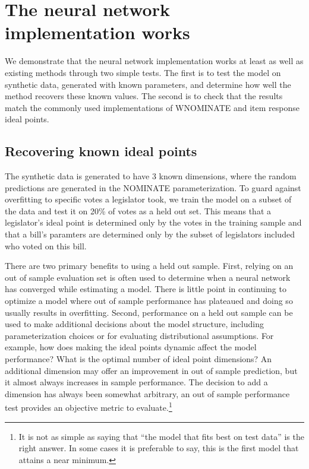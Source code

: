 \documentclass[11pt,]{article}
\begin{document}
\section{The neural network implementation
works}\label{the-neural-network-implementation-works}

We demonstrate that the neural network implementation works at least as
well as existing methods through two simple tests. The first is to test
the model on synthetic data, generated with known parameters, and
determine how well the method recovers these known values. The second is
to check that the results match the commonly used implementations of
WNOMINATE \citep{wnominate} and item response \citep{pscl} ideal points.

\subsection{Recovering known ideal
points}\label{recovering-known-ideal-points}

The synthetic data is generated to have 3 known dimensions, where the
random predictions are generated in the NOMINATE parameterization. To
guard against overfitting to specific votes a legislator took, we train
the model on a subset of the data and test it on 20\% of votes as a held
out set. This means that a legislator's ideal point is determined only
by the votes in the training sample and that a bill's paramters are
determined only by the subset of legislators included who voted on this
bill.

There are two primary benefits to using a held out sample. First,
relying on an out of sample evaluation set is often used to determine
when a neural network has converged while estimating a model. There is
little point in continuing to optimize a model where out of sample
performance has plateaued and doing so usually results in overfitting.
Second, performance on a held out sample can be used to make additional
decisions about the model structure, including parameterization choices
or for evaluating distributional assumptions. For example, how does
making the ideal points dynamic affect the model performance? What is
the optimal number of ideal point dimensions? An additional dimension
may offer an improvement in out of sample prediction, but it almost
always increases in sample performance. The decision to add a dimension
has always been somewhat arbitrary, an out of sample performance test
provides an objective metric to evaluate.\footnote{It is not as simple
  as saying that ``the model that fits best on test data'' is the right
  answer. In some cases it is preferable to say, this is the first model
  that attains a near minimum.}
\end{document}
